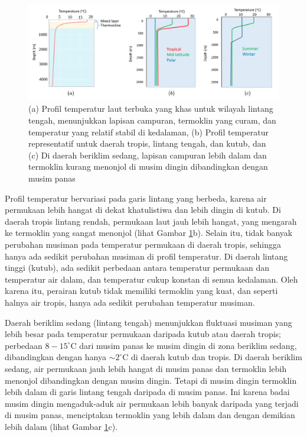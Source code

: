 \begin{spacing}{1.5}
	\begin{figure}[H]
		\centering
		\includegraphics[width=15cm]{contents/mld_theory}
		\caption{(a) Profil temperatur laut terbuka yang khas untuk wilayah lintang tengah, menunjukkan lapisan campuran, termoklin yang curam, dan temperatur yang relatif stabil di kedalaman, (b) Profil temperatur representatif untuk daerah tropis, lintang tengah, dan kutub, dan (c) Di daerah beriklim sedang, lapisan campuran lebih dalam dan termoklin kurang menonjol di musim dingin dibandingkan dengan musim panas  \protect{}}
		\label{fig:mld_theory}
	\end{figure}
	 Profil temperatur bervariasi pada garis lintang yang berbeda, karena air permukaan lebih hangat di dekat khatulistiwa dan lebih dingin di kutub. Di daerah tropis lintang rendah, permukaan laut jauh lebih hangat, yang mengarah ke termoklin yang sangat menonjol (lihat Gambar \ref{fig:mld_theory}b). Selain itu, tidak banyak perubahan musiman pada temperatur permukaan di daerah tropis, sehingga hanya ada sedikit perubahan musiman di profil temperatur. Di daerah lintang tinggi (kutub), ada sedikit perbedaan antara temperatur permukaan dan temperatur air dalam, dan temperatur cukup konstan di semua  kedalaman. Oleh karena itu, perairan kutub tidak memiliki termoklin yang kuat, dan seperti halnya air tropis, hanya ada sedikit perubahan temperatur musiman. 
	 
	 Daerah beriklim sedang (lintang tengah) menunjukkan fluktuasi musiman yang lebih besar pada temperatur permukaan daripada kutub atau daerah tropis; perbedaan $8-15^\circ$C dari musim panas ke musim dingin di zona beriklim sedang, dibandingkan dengan hanya $\sim 2^\circ$C di daerah kutub dan tropis. Di daerah beriklim sedang, air permukaan jauh lebih hangat di musim panas dan termoklin lebih menonjol dibandingkan dengan musim dingin. Tetapi di musim dingin termoklin lebih dalam di garis lintang tengah daripada di musim panas. Ini karena badai musim dingin mengaduk-aduk air permukaan lebih banyak daripada yang terjadi di musim panas, menciptakan termoklin yang lebih dalam dan dengan demikian lebih dalam (lihat Gambar \ref{fig:mld_theory}c).
\end{spacing}
\vspace{-0.1pc}
%
